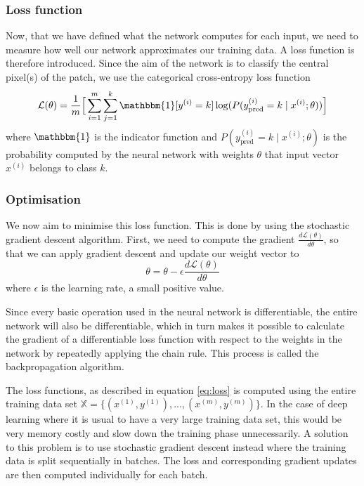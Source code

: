\documentclass[12pt,a4paper,twoside,openright]{report}
\begin{document}
\subsubsection{Loss function}
Now, that we have defined what the network computes for each input, we need to measure how well our network approximates our training data. A loss function is therefore introduced. Since the aim of the network is to classify the central pixel(s) of the patch, we use the categorical cross-entropy loss function
\begin{equation}
	\label{eq:loss}
	\mathcal{L}(\theta) = 
	\frac{1}{m}\Big[\sum_{i=1}^m \sum_{j=1}^k\mathbbm{1}[y^{(i)} = k]\log(P(y_{\text{pred}}^{(i)}=k \mid x^{(i)};\theta))\Big]
\end{equation}
where $\mathbbm{1}$ is the indicator function and $P(y_{\text{pred}}^{(i)}=k \mid x^{(i)};\theta)$ is the probability computed by the neural network with weights $\theta$ that input vector $x^{(i)}$ belongs to class $k$.

\subsubsection{Optimisation}
We now aim to minimise this loss function. This is done by using the stochastic gradient descent algorithm. First, we need to compute the gradient $\frac{d\mathcal{L}(\theta)}{d\theta}$, so that we can apply gradient descent and update our weight vector to
\begin{equation}
	\theta = \theta - \epsilon \frac{d\mathcal{L}(\theta)}{d\theta}
\end{equation}
where $\epsilon$ is the learning rate, a small positive value.

Since every basic operation used in the neural network is differentiable, the entire network will also be differentiable, which in turn makes it possible to calculate the gradient of a differentiable loss function with respect to the weights in the network by repeatedly applying the chain rule. This process is called the backpropagation algorithm.

The loss functions, as described in equation \ref{eq:loss} is computed using the entire training data set $\mathbb{X} = \{(x^{(1)},y^{(1)}), ...,(x^{(m)},y^{(m)})\}$. In the case of deep learning where it is usual to have a very large training data set, this would be very memory costly and slow down the training phase unnecessarily. A solution to this problem is to use stochastic gradient descent instead where the training data is split sequentially in batches. The loss and corresponding gradient updates are then computed individually for each batch.
\end{document}
